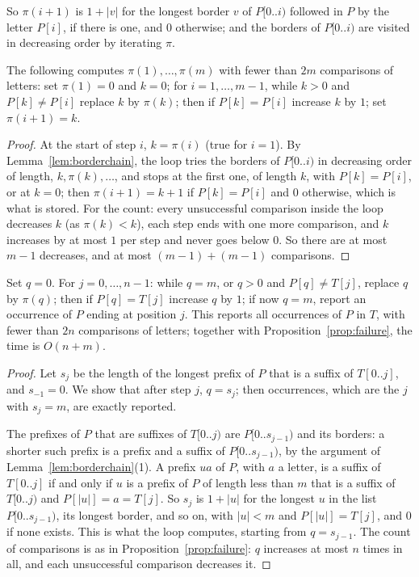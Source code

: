 So $\pi(i+1)$ is $1+|v|$ for the longest border $v$ of $P[0..i)$ followed in $P$ by the letter $P[i]$, if there is one, and $0$ otherwise; and the borders of $P[0..i)$ are visited in decreasing order by iterating $\pi$.

\begin{proposition}\label{prop:failure}
The following computes $\pi(1),\dots,\pi(m)$ with fewer than $2m$ comparisons of letters: set $\pi(1)=0$ and $k=0$; for $i=1,\dots,m-1$, while $k>0$ and $P[k]\ne P[i]$ replace $k$ by $\pi(k)$; then if $P[k]=P[i]$ increase $k$ by $1$; set $\pi(i+1)=k$.
\end{proposition}
\begin{proof}
At the start of step $i$, $k=\pi(i)$ (true for $i=1$). By Lemma~\ref{lem:borderchain}, the loop tries the borders of $P[0..i)$ in decreasing order of length, $k,\pi(k),\dots$, and stops at the first one, of length $k$, with $P[k]=P[i]$, or at $k=0$; then $\pi(i+1)=k+1$ if $P[k]=P[i]$ and $0$ otherwise, which is what is stored. For the count: every unsuccessful comparison inside the loop decreases $k$ (as $\pi(k)<k$), each step ends with one more comparison, and $k$ increases by at most $1$ per step and never goes below $0$.
So there are at most $m-1$ decreases, and at most $(m-1)+(m-1)$ comparisons.
\end{proof}

\begin{theorem}\label{thm:kmp}
Set $q=0$. For $j=0,\dots,n-1$: while $q=m$, or $q>0$ and $P[q]\ne T[j]$, replace $q$ by $\pi(q)$; then if $P[q]=T[j]$ increase $q$ by $1$; if now $q=m$, report an occurrence of $P$ ending at position $j$. This reports all occurrences of $P$ in $T$, with fewer than $2n$ comparisons of letters; together with Proposition~\ref{prop:failure}, the time is $O(n+m)$.
\end{theorem}
\begin{proof}
Let $s_j$ be the length of the longest prefix of $P$ that is a suffix of $T[0..j]$, and $s_{-1}=0$. We show that after step $j$, $q=s_j$; then occurrences, which are the $j$ with $s_j=m$, are exactly reported.

The prefixes of $P$ that are suffixes of $T[0..j)$ are $P[0..s_{j-1})$ and its borders: a shorter such prefix is a prefix and a suffix of $P[0..s_{j-1})$, by the argument of Lemma~\ref{lem:borderchain}(1). A prefix $ua$ of $P$, with $a$ a letter, is a suffix of $T[0..j]$ if and only if $u$ is a prefix of $P$ of length less than $m$ that is a suffix of $T[0..j)$ and $P[|u|]=a=T[j]$.
So $s_j$ is $1+|u|$ for the longest $u$ in the list $P[0..s_{j-1})$, its longest border, and so on, with $|u|<m$ and $P[|u|]=T[j]$, and $0$ if none exists. This is what the loop computes, starting from $q=s_{j-1}$. The count of comparisons is as in Proposition~\ref{prop:failure}: $q$ increases at most $n$ times in all, and each unsuccessful comparison decreases it.
\end{proof}

